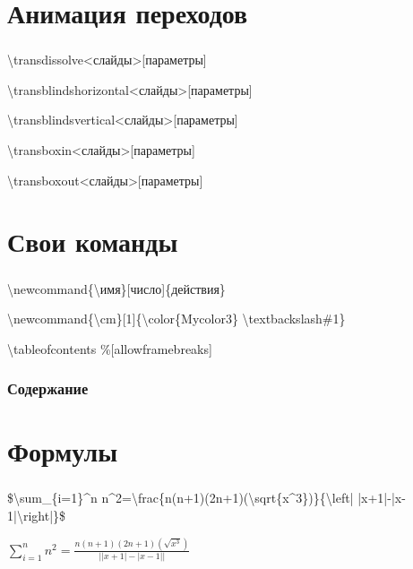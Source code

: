 \documentclass[russian, 14pt]{beamer}
\newcommand{\cm}[1]{{\color{Mycolor3}\textbackslash#1}}
\begin{document}
\section{Анимация переходов}

\begin{frame}
	\frametitle{\insertsection}
	\begin{block}{}
		\cm{transdissolve}<слайды>[параметры]
		
		
		\cm{transblindshorizontal}<слайды>[параметры]
		
		
		\cm{transblindsvertical}<слайды>[параметры]
		
		
		\cm{transboxin}<слайды>[параметры]
		
		
		\cm{transboxout}<слайды>[параметры]
	\end{block}
\end{frame}

\section{Свои команды}

\begin{frame}
	\frametitle{\insertsection}
	\begin{block}{}
		\cm{newcommand}\{\textbackslash имя\}[число]\{действия\}
	\end{block}
	\begin{block}{}
		\cm{newcommand}\{\textbackslash cm\}[1]\{\cm{color}\{Mycolor3\}
		\cm{textbackslash}\#1\}
	\end{block}
\end{frame}

\begin{frame}[allowframebreaks]{}
	\begin{block}{}
		\cm{tableofcontents} \%[allowframebreaks]
	\end{block}
	\frametitle{Содержание}
	\tableofcontents
\end{frame}

\section{Формулы}

\begin{frame}
	\frametitle{\insertsection}
	\begin{block}{}
		\$\cm{sum}\_\{i=1\}\string^n n\string^2=\cm{frac}\{n(n+1)(2n+1)(\cm{sqrt}\{x\string^3\})\}\{\cm{left}| |x+1|-|x-1|\cm{right}|\}\$
	\end{block}
	\LARGE$\sum_{i=1}^n n^2=\frac{n(n+1)(2n+1)(\sqrt{x^3})}{\left| |x+1|-|x-1|\right|}$
\end{frame}
\end{document}
